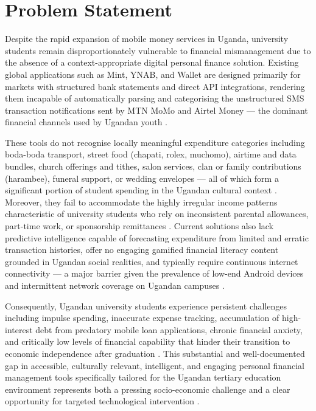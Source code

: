 \documentclass[12pt,a4paper]{report}
\begin{document}
\section{Problem Statement}

Despite the rapid expansion of mobile money services in Uganda, university students
remain disproportionately vulnerable to financial mismanagement due to the absence of
a context-appropriate digital personal finance solution. Existing global applications
such as Mint, YNAB, and Wallet are designed primarily for markets with structured
bank statements and direct API integrations, rendering them incapable of automatically
parsing and categorising the unstructured SMS transaction notifications sent by MTN
MoMo and Airtel Money --- the dominant financial channels used by Ugandan youth
\citep{BOU2024}.

These tools do not recognise locally meaningful expenditure categories including
boda-boda transport, street food (chapati, rolex, muchomo), airtime and data bundles,
church offerings and tithes, salon services, clan or family contributions (harambee),
funeral support, or wedding envelopes --- all of which form a significant portion of
student spending in the Ugandan cultural context \citep{AmanaAndTamunomiegbam2024}.
Moreover, they fail to accommodate the highly irregular income patterns characteristic
of university students who rely on inconsistent parental allowances, part-time work, or
sponsorship remittances \citep{MoFPED2023}. Current solutions also lack predictive
intelligence capable of forecasting expenditure from limited and erratic transaction
histories, offer no engaging gamified financial literacy content grounded in Ugandan
social realities, and typically require continuous internet connectivity --- a major
barrier given the prevalence of low-end Android devices and intermittent network
coverage on Ugandan campuses \citep{UBOS2024}.

Consequently, Ugandan university students experience persistent challenges including
impulse spending, inaccurate expense tracking, accumulation of high-interest debt from
predatory mobile loan applications, chronic financial anxiety, and critically low levels
of financial capability that hinder their transition to economic independence after
graduation \citep{MoFPED2023,AmanaAndTamunomiegbam2024}. This substantial and
well-documented gap in accessible, culturally relevant, intelligent, and engaging
personal financial management tools specifically tailored for the Ugandan tertiary
education environment represents both a pressing socio-economic challenge and a clear
opportunity for targeted technological intervention \citep{Mursi2024,Imawan2025}.
\end{document}
